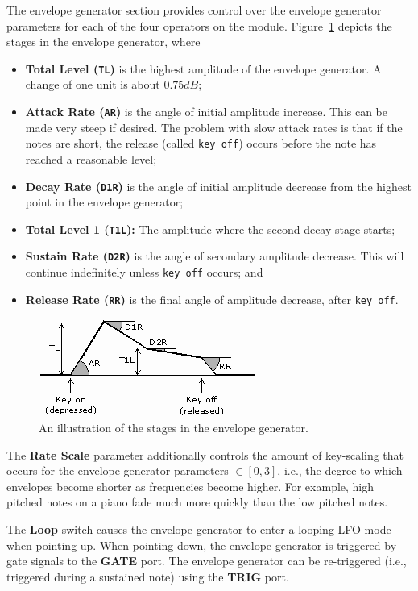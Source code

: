 \documentclass[12pt,letter]{article}
\begin{document}
The envelope generator section provides control over the envelope generator parameters for each of the four operators on the module. Figure~\ref{fig:envelope-generator} depicts the stages in the envelope generator, where
\begin{itemize}
 \item \textbf{Total Level (\texttt{TL})} is the highest amplitude of the envelope generator. A change of one unit is about $0.75dB$;
 \item \textbf{Attack Rate (\texttt{AR})} is the angle of initial amplitude increase. This can be made very steep if desired. The problem with slow attack rates is that if the notes are short, the release (called \texttt{key off}) occurs before the note has reached a reasonable level;
 \item \textbf{Decay Rate (\texttt{D1R})} is the angle of initial amplitude decrease from the highest point in the envelope generator;
 \item \textbf{Total Level 1 (\texttt{T1L}):} The amplitude where the second decay stage starts;
 \item \textbf{Sustain Rate (\texttt{D2R})} is the angle of secondary amplitude decrease. This will continue indefinitely unless \texttt{key off} occurs; and
 \item \textbf{Release Rate (\texttt{RR})} is the final angle of amplitude decrease, after \texttt{key off}.
\end{itemize}

\begin{figure}[!htp]
\centering
\caption{An illustration of the stages in the envelope generator.}
\label{fig:envelope-generator}
\includegraphics[width=\maxwidth{\textwidth}]{img/envelope}
\end{figure}

The \textbf{Rate Scale} parameter additionally controls the amount of key-scaling that occurs for the envelope generator parameters $\in [0, 3]$, i.e., the degree to which envelopes become shorter as frequencies become higher. For example, high pitched notes on a piano fade much more quickly than the low pitched notes.

The \textbf{Loop} switch causes the envelope generator to enter a looping LFO mode when pointing up. When pointing down, the envelope generator is triggered by gate signals to the \textbf{GATE} port. The envelope generator can be re-triggered (i.e., triggered during a sustained note) using the \textbf{TRIG} port.
\end{document}
